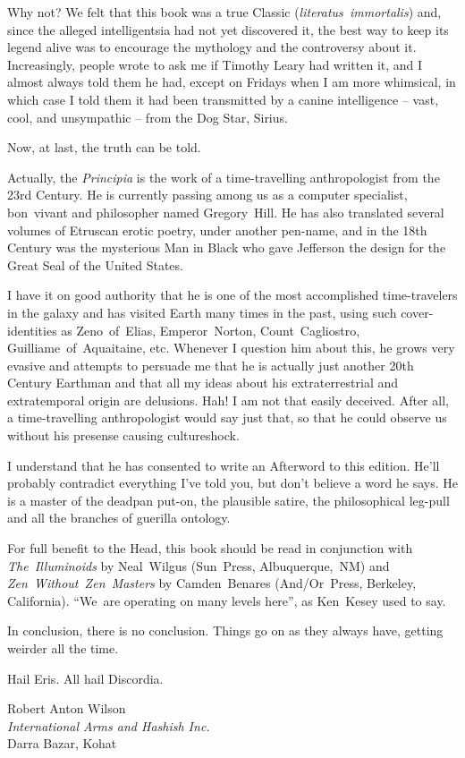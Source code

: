 Why not? We felt that this book was a true Classic
(\textit{literatus~immortalis}) and, since the alleged intelligentsia
had not yet discovered it, the best way to keep its legend alive was
to encourage the mythology and the controversy about it. Increasingly,
people wrote to ask me if Timothy Leary had written it, and I almost
always told them he had, except on Fridays when I am more whimsical,
in which case I told them it had been transmitted by a canine
intelligence -- vast, cool, and unsympathic -- from the Dog Star,
Sirius.

Now, at last, the truth can be told.

\pagebreak

Actually, the \textit{Principia} is the work of a time-travelling
anthropologist from the 23rd Century. He is currently passing among us
as a computer specialist, bon~vivant and philosopher named
Gregory~Hill. He has also translated several volumes of Etruscan
erotic poetry, under another pen-name,
and in the 18th Century was the mysterious Man in Black who gave
Jefferson the design for the Great Seal of the United States.

I have it on good authority that he is one of the most accomplished
time-travelers in the galaxy and has visited Earth many times in the
past, using such cover-identities as Zeno~of~Elias,
Emperor~Norton, Count~Cagliostro,
Guilliame~of~Aquaitaine, etc. Whenever I question him about this, he
grows very evasive and attempts to persuade me that he is actually
just another 20th Century Earthman and that all my ideas about his
extraterrestrial and extratemporal origin are delusions. Hah! I am not
that easily deceived. After all, a time-travelling anthropologist
would say just that, so that he could observe us without his presense
causing cultureshock.

I understand that he has consented to write an Afterword to this
edition. He'll probably contradict everything I've told you, but don't
believe a word he says. He is a master of the deadpan
put-on, the plausible satire, the philosophical leg-pull and all the
branches of guerilla ontology.

For full benefit to the Head, this book should be read in conjunction
with \textit{The~Illuminoids} by Neal~Wilgus (Sun~Press,
Albuquerque,~NM) and \textit{Zen~Without~Zen~Masters} by
Camden~Benares (And/Or~Press, Berkeley, California). ``We~are
operating on many levels here'', as Ken~Kesey used to say.

In conclusion, there is no conclusion. Things go on as they always
have, getting weirder all the time.

Hail Eris. All hail Discordia.

\begin{blockattribution}
Robert Anton Wilson \\
\textit{International Arms and Hashish Inc.} \\
Darra Bazar, Kohat
\end{blockattribution}

